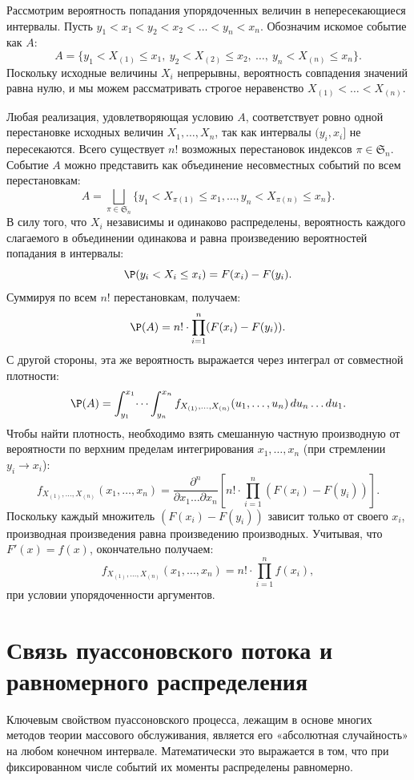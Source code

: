 \begin{lproof}
Рассмотрим вероятность попадания упорядоченных величин в непересекающиеся интервалы. Пусть $y_1 < x_1 < y_2 < x_2 < \dots < y_n < x_n$. Обозначим искомое событие как $A$:
$$ A = \{y_1 < X_{(1)} \le x_1, \: y_2 < X_{(2)} \le x_2, \: \dots, \: y_n < X_{(n)} \le x_n\}. $$
Поскольку исходные величины $X_i$ непрерывны, вероятность совпадения значений равна нулю, и мы можем рассматривать строгое неравенство $X_{(1)} < \dots < X_{(n)}$.

Любая реализация, удовлетворяющая условию $A$, соответствует ровно одной перестановке исходных величин $X_1, \dots, X_n$, так как интервалы $(y_i, x_i]$ не пересекаются. Всего существует $n!$ возможных перестановок индексов $\pi \in \mathfrak{S}_n$.
Событие $A$ можно представить как объединение несовместных событий по всем перестановкам:
$$
A = \bigsqcup_{\pi \in \mathfrak{S}_n} \{ y_1 < X_{\pi(1)} \le x_1, \dots, y_n < X_{\pi(n)} \le x_n \}.
$$
В силу того, что $X_i$ независимы и одинаково распределены, вероятность каждого слагаемого в объединении одинакова и равна произведению вероятностей попадания в интервалы:
$$
\P(y_i < X_i \le x_i) = F(x_i) - F(y_i).
$$
Суммируя по всем $n!$ перестановкам, получаем:
$$
\P(A) = n! \cdot \prod_{i=1}^n (F(x_i) - F(y_i)).
$$
С другой стороны, эта же вероятность выражается через интеграл от совместной плотности:
$$
\P(A) = \int_{y_1}^{x_1} \dots \int_{y_n}^{x_n} f_{X_{(1)}, \dots, X_{(n)}}(u_1, \dots, u_n) \, du_n \dots du_1.
$$
Чтобы найти плотность, необходимо взять смешанную частную производную от вероятности по верхним пределам интегрирования $x_1, \dots, x_n$ (при стремлении $y_i \to x_i$):
$$
f_{X_{(1)}, \dots, X_{(n)}}(x_1, \dots, x_n) = \frac{\partial^n}{\partial x_1 \dots \partial x_n} \left[ n! \cdot \prod_{i=1}^n (F(x_i) - F(y_i)) \right].
$$
Поскольку каждый множитель $(F(x_i) - F(y_i))$ зависит только от своего $x_i$, производная произведения равна произведению производных. Учитывая, что $F'(x) = f(x)$, окончательно получаем:
$$
f_{X_{(1)}, \dots, X_{(n)}}(x_1, \dots, x_n) = n! \cdot \prod_{i=1}^n f(x_i),
$$
при условии упорядоченности аргументов.
\end{lproof}

\section{Связь пуассоновского потока и равномерного распределения}

Ключевым свойством пуассоновского процесса, лежащим в основе многих методов теории массового обслуживания, является его «абсолютная случайность» на любом конечном интервале. Математически это выражается в том, что при фиксированном числе событий их моменты распределены равномерно.

